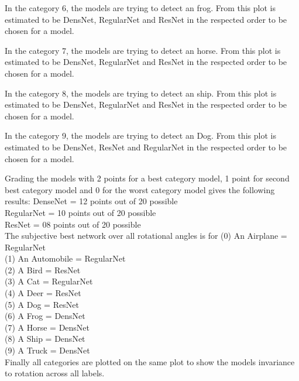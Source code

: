 In the category 6, the models are trying to detect an frog. From this plot is estimated to be DensNet, RegularNet and ResNet in the respected order to be chosen for a model. 

\FloatBarrier 

In the category 7, the models are trying to detect an horse. From this plot is estimated to be DensNet, RegularNet and ResNet in the respected order to be chosen for a model.

\FloatBarrier 

In the category 8, the models are trying to detect an ship. From this plot is estimated to be DensNet, RegularNet and ResNet in the respected order to be chosen for a model. 

\FloatBarrier 

In the category 9, the models are trying to detect an Dog. From this plot is estimated to be DensNet, ResNet and RegularNet in the respected order to be chosen for a model. 

\FloatBarrier

Grading the models with 2 points for a best category model, 1 point for second best category model and 0 for the worst category model gives the following results:
DenseNet   = 12 points out of 20 possible\\
RegularNet = 10 points out of 20 possible\\
ResNet     = 08 points out of 20 possible\\

The subjective best network over all rotational angles is for
(0) An Airplane   = RegularNet\\
(1) An Automobile = RegularNet\\
(2) A Bird        = ResNet\\ 
(3) A Cat         = RegularNet\\
(4) A Deer        = ResNet\\
(5) A Dog         = ResNet\\
(6) A Frog        = DensNet\\
(7) A Horse       = DensNet\\
(8) A Ship        = DensNet\\
(9) A Truck       = DensNet\\

Finally all categories are plotted on the same plot to show the models invariance to rotation across all labels.
